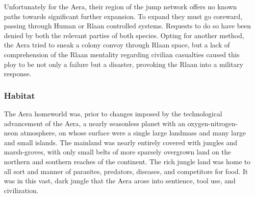 Unfortunately for the Aera, their region of the jump network offers no
known paths towards significant further expansion. To expand they must
go coreward, passing through Human or Rlaan controlled
systems. Requests to do so have been denied by both the relevant
parties of both species. Opting for another method, the Aera tried to
sneak a colony convoy through Rlaan space, but a lack of comprehension
of the Rlaan mentality regarding civilian casualties caused this ploy
to be not only a failure but a disaster, provoking the Rlaan into a
military response.

\subsubsection{Habitat}
The Aera homeworld was, prior to changes imposed by the technological
advancement of the Aera, a nearly seasonless planet with an
oxygen-nitrogen-neon atmosphere, on whose surface were a single large
landmass and many large and small islands. The mainland was nearly
entirely covered with jungles and marsh-groves, with only small belts
of more sparsely overgrown land on the northern and southern reaches
of the continent. The rich jungle land was home to all sort and manner
of parasites, predators, diseases, and competitors for food. It was in
this vast, dark jungle that the Aera arose into sentience, tool use,
and civilization.

